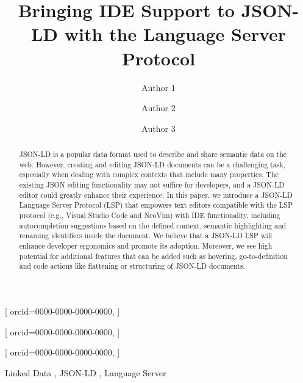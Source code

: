 \documentclass[
]{ceurart}
\begin{document}



\title{Bringing IDE Support to JSON-LD with the Language Server Protocol}


\author[1]{Author 1}[%
orcid=0000-0000-0000-0000,
]
\author[1]{Author 2}[%
orcid=0000-0000-0000-0000,
]
\author[1]{Author 3}[%
orcid=0000-0000-0000-0000,
]
\address[1]{Some place on the world}


\begin{abstract}
  JSON-LD is a popular data format used to describe and share semantic data on the web.
  However, creating and editing JSON-LD documents can be a challenging task, especially when dealing with complex contexts that include many properties.
  The existing JSON editing functionality may not suffice for developers, and a JSON-LD editor could greatly enhance their experience.
  In this paper, we introduce a JSON-LD Language Server Protocol (LSP) that empowers text editors compatible with the LSP protocol (e.g., Visual Studio Code and NeoVim) with IDE functionality, including autocompletion suggestions based on the defined context, semantic highlighting and renaming identifiers inside the document.
  We believe that a JSON-LD LSP will enhance developer ergonomics and promote its adoption.
  Moreover, we see high potential for additional features that can be added such as hovering, go-to-definition and code actions like flattening or structuring of JSON-LD documents.
\end{abstract}

\begin{keywords}
  Linked Data \sep 
  JSON-LD \sep
  Language Server
\end{keywords}
\end{document}
